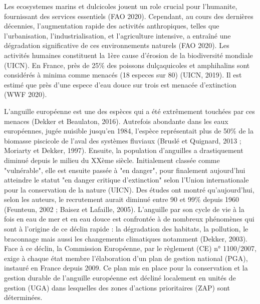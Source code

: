 \documentclass[11pt,titlepage,twoside]{article}\usepackage[]{graphicx}\usepackage[table]{xcolor}
\begin{document}
Les ecosystemes marins et dulcicoles jouent un role crucial pour l'humanite, fournissant des services essentiels (FAO 2020). 
Cependant, au cours des dernières décennies, l'augmentation rapide des activités anthropiques, telles que l'urbanisation, l'industrialisation, et l'agriculture intensive, a entraîné une dégradation significative de ces environnements naturels (FAO 2020). 
Les activités humaines constituent la 1ère cause d’érosion de la biodiversité mondiale (UICN). 
En France, près de 25\% des poissons dulçaquicoles et amphihalins sont considérés à minima comme menacés (18 especes sur 80) (UICN, 2019). 
Il est estimé que près d’une espece d’eau douce sur trois est menacée d’extinction (WWF 2020). 

L’anguille européenne est une des espèces qui a été extrêmement touchées par ces menaces (Dekker et Beaulaton, 2016). Autrefois abondante dans les eaux européennes, jugée nuisible jusqu’en 1984, l’espèce représentait plus de 50\% de la biomasse piscicole de l’aval des systèmes fluviaux (Bruslé et Quignard, 2013 ; Moriarty et Dekker, 1997). 
Ensuite, la population d'anguilles a drastiquement diminué depuis le milieu du XXème siècle. Initialement classée comme "vulnérable", elle est ensuite passée à "en danger", pour finalement aujourd’hui atteindre le statut "en danger critique d'extinction" selon l'Union internationale pour la conservation de la nature (UICN). Des études ont montré qu’aujourd’hui, selon les auteurs, le recrutement aurait diminué entre 90 et 99\% depuis 1960 (Feunteun, 2002 ; Baisez et Lafaille, 2005). 
L’anguille par son cycle de vie à la fois en eau de mer et en eau douce est confrontée à de nombreux phénomènes qui sont à l’origine de ce déclin rapide : la dégradation des habitats, la pollution, le braconnage mais aussi les changements climatiques notamment (Dekker, 2003). Face à ce déclin, la Commission Européenne, par le règlement (CE) n° 1100/2007, exige à chaque état membre l’élaboration d’un plan de gestion national (PGA), instauré en France depuis 2009.
Ce plan mis en place pour la conservation et la gestion durable de l’anguille européenne est décliné localement en unités de gestion (UGA) dans lesquelles des zones d’actions prioritaires (ZAP) sont déterminées.
\end{document}

